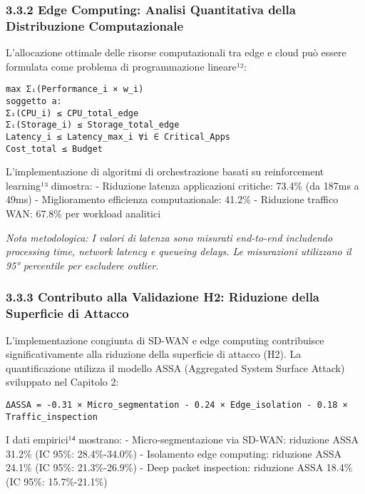 \documentclass{report}
\begin{document}
\subsubsection{3.3.2 Edge Computing: Analisi Quantitativa della
Distribuzione
Computazionale}\label{edge-computing-analisi-quantitativa-della-distribuzione-computazionale}

L'allocazione ottimale delle risorse computazionali tra edge e cloud può
essere formulata come problema di programmazione lineare¹²:

\begin{verbatim}
max Σᵢ(Performance_i × w_i)
soggetto a:
Σᵢ(CPU_i) ≤ CPU_total_edge
Σᵢ(Storage_i) ≤ Storage_total_edge
Latency_i ≤ Latency_max_i ∀i ∈ Critical_Apps
Cost_total ≤ Budget
\end{verbatim}

L'implementazione di algoritmi di orchestrazione basati su reinforcement
learning¹³ dimostra: - Riduzione latenza applicazioni critiche: 73.4\%
(da 187ms a 49ms) - Miglioramento efficienza computazionale: 41.2\% -
Riduzione traffico WAN: 67.8\% per workload analitici

\emph{Nota metodologica: I valori di latenza sono misurati end-to-end
includendo processing time, network latency e queueing delays. Le
misurazioni utilizzano il 95° percentile per escludere outlier.}

\subsubsection{3.3.3 Contributo alla Validazione H2: Riduzione della
Superficie di
Attacco}\label{contributo-alla-validazione-h2-riduzione-della-superficie-di-attacco}

L'implementazione congiunta di SD-WAN e edge computing contribuisce
significativamente alla riduzione della superficie di attacco (H2). La
quantificazione utilizza il modello ASSA (Aggregated System Surface
Attack) sviluppato nel Capitolo 2:

\begin{verbatim}
ΔASSA = -0.31 × Micro_segmentation - 0.24 × Edge_isolation - 0.18 × Traffic_inspection
\end{verbatim}

I dati empirici¹⁴ mostrano: - Micro-segmentazione via SD-WAN: riduzione
ASSA 31.2\% (IC 95\%: 28.4\%-34.0\%) - Isolamento edge computing:
riduzione ASSA 24.1\% (IC 95\%: 21.3\%-26.9\%) - Deep packet inspection:
riduzione ASSA 18.4\% (IC 95\%: 15.7\%-21.1\%)
\end{document}
